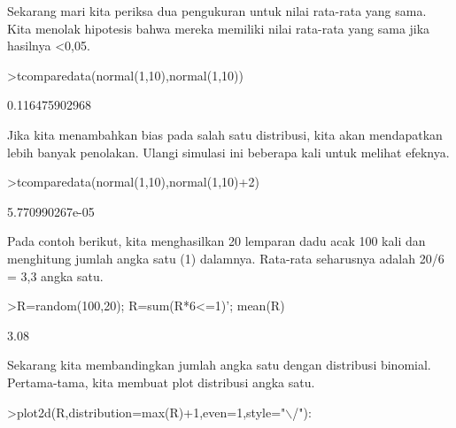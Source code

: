 \documentclass[12pt,arial,letterpaper]{book}
\begin{document}
\begin{eulercomment}
\begin{eulercomment}
\begin{eulercomment}
\begin{eulercomment}
\begin{eulercomment}
\begin{eulercomment}
\begin{eulercomment}
\begin{eulercomment}
\begin{eulercomment}
\begin{eulercomment}
\begin{eulercomment}
\begin{eulercomment}
\begin{eulercomment}
\begin{eulercomment}
\begin{eulercomment}
\begin{eulercomment}
\begin{eulercomment}
\begin{eulercomment}
\begin{eulercomment}
\begin{eulercomment}
\begin{eulercomment}
\begin{eulercomment}
\begin{eulercomment}
\begin{eulercomment}
\begin{eulercomment}
\begin{eulercomment}
\begin{eulercomment}
\begin{eulercomment}
\begin{eulercomment}
\begin{eulercomment}
\begin{eulercomment}
\begin{eulercomment}
\begin{eulercomment}
Sekarang mari kita periksa dua pengukuran untuk nilai rata-rata yang
sama. Kita menolak hipotesis bahwa mereka memiliki nilai rata-rata
yang sama jika hasilnya \textless{}0,05.
\end{eulercomment}
\begin{eulerprompt}
>tcomparedata(normal(1,10),normal(1,10))
\end{eulerprompt}
\begin{euleroutput}
  0.116475902968
\end{euleroutput}
\begin{eulercomment}
Jika kita menambahkan bias pada salah satu distribusi, kita akan
mendapatkan lebih banyak penolakan. Ulangi simulasi ini beberapa kali
untuk melihat efeknya.
\end{eulercomment}
\begin{eulerprompt}
>tcomparedata(normal(1,10),normal(1,10)+2)
\end{eulerprompt}
\begin{euleroutput}
  5.770990267e-05
\end{euleroutput}
\begin{eulercomment}
Pada contoh berikut, kita menghasilkan 20 lemparan dadu acak 100 kali
dan menghitung jumlah angka satu (1) dalamnya. Rata-rata seharusnya
adalah 20/6 = 3,3 angka satu.
\end{eulercomment}
\begin{eulerprompt}
>R=random(100,20); R=sum(R*6<=1)'; mean(R)
\end{eulerprompt}
\begin{euleroutput}
  3.08
\end{euleroutput}
\begin{eulercomment}
Sekarang kita membandingkan jumlah angka satu dengan distribusi
binomial. Pertama-tama, kita membuat plot distribusi angka satu.
\end{eulercomment}
\begin{eulerprompt}
>plot2d(R,distribution=max(R)+1,even=1,style="\(\backslash\)/"):

\end{eulerprompt}
\end{eulercomment}
\end{eulercomment}
\end{eulercomment}
\end{eulercomment}
\end{eulercomment}
\end{eulercomment}
\end{eulercomment}
\end{eulercomment}
\end{eulercomment}
\end{eulercomment}
\end{eulercomment}
\end{eulercomment}
\end{eulercomment}
\end{eulercomment}
\end{eulercomment}
\end{eulercomment}
\end{eulercomment}
\end{eulercomment}
\end{eulercomment}
\end{eulercomment}
\end{eulercomment}
\end{eulercomment}
\end{eulercomment}
\end{eulercomment}
\end{eulercomment}
\end{eulercomment}
\end{eulercomment}
\end{eulercomment}
\end{eulercomment}
\end{eulercomment}
\end{eulercomment}
\end{eulercomment}
\end{document}
